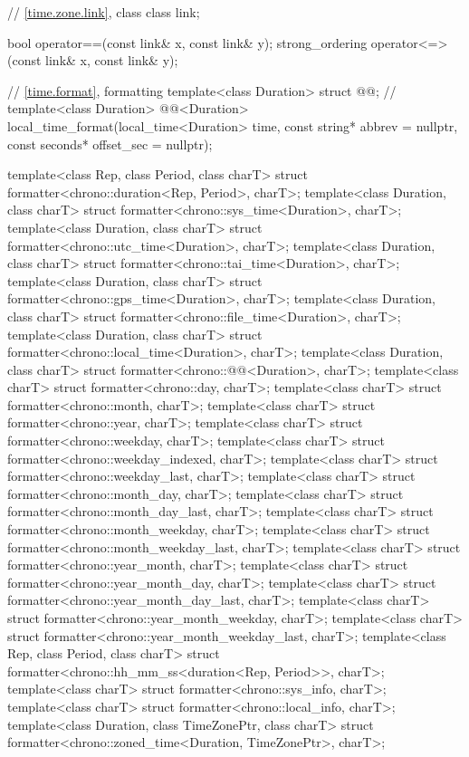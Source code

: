 \begin{codeblock}
{{    // \ref{time.zone.link}, class 
    class link;

    bool operator==(const link& x, const link& y);
    strong_ordering operator<=>(const link& x, const link& y);

    // \ref{time.format}, formatting
    template<class Duration> struct @@;        // \expos
    template<class Duration>
      @@<Duration>
        local_time_format(local_time<Duration> time, const string* abbrev = nullptr,
                          const seconds* offset_sec = nullptr);
  }

  template<class Rep, class Period, class charT>
    struct formatter<chrono::duration<Rep, Period>, charT>;
  template<class Duration, class charT>
    struct formatter<chrono::sys_time<Duration>, charT>;
  template<class Duration, class charT>
    struct formatter<chrono::utc_time<Duration>, charT>;
  template<class Duration, class charT>
    struct formatter<chrono::tai_time<Duration>, charT>;
  template<class Duration, class charT>
    struct formatter<chrono::gps_time<Duration>, charT>;
  template<class Duration, class charT>
    struct formatter<chrono::file_time<Duration>, charT>;
  template<class Duration, class charT>
    struct formatter<chrono::local_time<Duration>, charT>;
  template<class Duration, class charT>
    struct formatter<chrono::@@<Duration>, charT>;
  template<class charT> struct formatter<chrono::day, charT>;
  template<class charT> struct formatter<chrono::month, charT>;
  template<class charT> struct formatter<chrono::year, charT>;
  template<class charT> struct formatter<chrono::weekday, charT>;
  template<class charT> struct formatter<chrono::weekday_indexed, charT>;
  template<class charT> struct formatter<chrono::weekday_last, charT>;
  template<class charT> struct formatter<chrono::month_day, charT>;
  template<class charT> struct formatter<chrono::month_day_last, charT>;
  template<class charT> struct formatter<chrono::month_weekday, charT>;
  template<class charT> struct formatter<chrono::month_weekday_last, charT>;
  template<class charT> struct formatter<chrono::year_month, charT>;
  template<class charT> struct formatter<chrono::year_month_day, charT>;
  template<class charT> struct formatter<chrono::year_month_day_last, charT>;
  template<class charT> struct formatter<chrono::year_month_weekday, charT>;
  template<class charT> struct formatter<chrono::year_month_weekday_last, charT>;
  template<class Rep, class Period, class charT>
    struct formatter<chrono::hh_mm_ss<duration<Rep, Period>>, charT>;
  template<class charT> struct formatter<chrono::sys_info, charT>;
  template<class charT> struct formatter<chrono::local_info, charT>;
  template<class Duration, class TimeZonePtr, class charT>
    struct formatter<chrono::zoned_time<Duration, TimeZonePtr>, charT>;

}
\end{codeblock}
